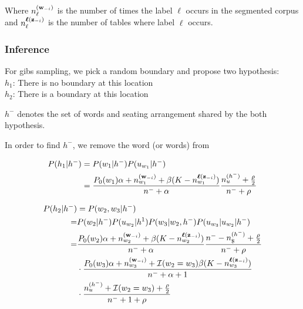 Where $n_{\ell}^{(\bm{\mathbf{w}}_{-i})}$ is the number of times the label $\ell$ occurs in the segmented corpus and $n_{\ell}^{\bm{\mathbf{\ell}}(\bm{\mathbf{z}}_{-i})}$ is the number of tables where label $\ell$ occurs.

\subsubsection{Inference}

For gibs sampling, we pick a random boundary and propose two hypothesis:
\\
$h_1$: There is no boundary at this location \\
$h_2$: There is a boundary at this location


$h^-$ denotes the set of words and seating arrangement shared by the both hypothesis.

In order to find $h^-$, we remove the word (or words) from 

\begin{align}
P(h_1 | h^-) &= P(w_1|h^-)P(u_{w_1} | h^{-}) \\
&= \dfrac{P_0(w_1)\alpha + n_{w_1}^{(\bm{\mathbf{w}}_{-i})}+ \beta (K - n_{w_1}^{\bm{\mathbf{\ell}}(\bm{\mathbf{z}}_{-i})})}{n^- + \alpha}
\dfrac{n_u^{(h^-)} + \frac{\rho}{2}}{n^- + \rho}
\end{align}

\begin{align}
P(h_2 | h^-) &= P(w_2,w_3|h^-)\\
=&P(w_2|h^-)P(u_{w_2}|h^1)P(w_3 | w_2,h^-)P(u_{w_3}|u_{w_2}|h^-) \\
=& \dfrac{P_0(w_2)\alpha + n_{w_2}^{(\bm{\mathbf{w}}_{-i})}+ \beta (K - n_{w_2}^{\bm{\mathbf{\ell}}(\bm{\mathbf{z}}_{-i})})}{n^- + \alpha}
\dfrac{n^- - n_\$^{(h^-)} + \frac{\rho}{2}}{n^- + \rho} \\
&\cdot 
\dfrac{P_0(w_3)\alpha + n_{w_3}^{(\bm{\mathbf{w}}_{-i})}+ \mathcal{I}(w_2 = w_3) \beta (K - n_{w_3}^{\bm{\mathbf{\ell}}(\bm{\mathbf{z}}_{-i})})}{n^- + \alpha + 1} \\
&\cdot
\dfrac{n_u^{(h^-)} + \mathcal{I}(w_2 = w_3)  + \frac{\rho}{2}}{n^- + 1 + \rho}
\end{align}

